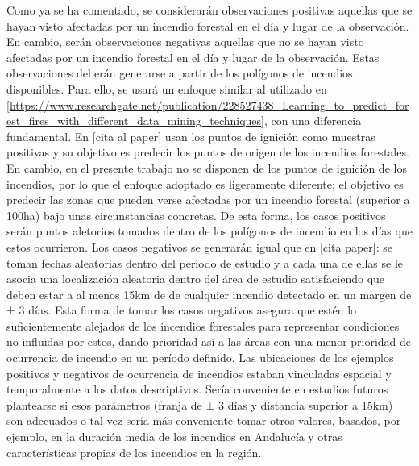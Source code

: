 \documentclass[12pt,a4paper,]{book}
\numberwithin{dummy}{section}
\theoremstyle{ocrenumbox}
\theoremstyle{blacknumex}
\theoremstyle{blacknumbox}
\theoremstyle{ocrenum}
\theoremstyle{ocrenum}
\begin{document}
Como ya se ha comentado, se considerarán observaciones positivas
aquellas que se hayan visto afectadas por un incendio forestal en el día
y lugar de la observación. En cambio, serán observaciones negativas
aquellas que no se hayan visto afectadas por un incendio forestal en el
día y lugar de la observación. Estas observaciones deberán generarse a
partir de los polígonos de incendios disponibles. Para ello, se usará un
enfoque similar al utilizado en
{[}\url{https://www.researchgate.net/publication/228527438_Learning_to_predict_forest_fires_with_different_data_mining_techniques}{]},
con una diferencia fundamental. En {[}cita al paper{]} usan los puntos
de ignición como muestras positivas y su objetivo es predecir los puntos
de origen de los incendios forestales. En cambio, en el presente trabajo
no se disponen de los puntos de ignición de los incendios, por lo que el
enfoque adoptado es ligeramente diferente; el objetivo es predecir las
zonas que pueden verse afectadas por un incendio forestal (superior a
100ha) bajo unas circunstancias concretas. De esta forma, los casos
positivos serán puntos aletorios tomados dentro de los polígonos de
incendio en los días que estos ocurrieron. Los casos negativos se
generarán igual que en {[}cita paper{]}: se toman fechas aleatorias
dentro del periodo de estudio y a cada una de ellas se le asocia una
localización aleatoria dentro del área de estudio satisfaciendo que
deben estar a al menos 15km de de cualquier incendio detectado en un
margen de ± 3 días. Esta forma de tomar los casos negativos asegura que
estén lo suficientemente alejados de los incendios forestales para
representar condiciones no influidas por estos, dando prioridad así a
las áreas con una menor prioridad de ocurrencia de incendio en un
período definido. Las ubicaciones de los ejemplos positivos y negativos
de ocurrencia de incendios estaban vinculadas espacial y temporalmente a
los datos descriptivos. Sería conveniente en estudios futuros plantearse
si esos parámetros (franja de ± 3 días y distancia superior a 15km) son
adecuados o tal vez sería más conveniente tomar otros valores, basados,
por ejemplo, en la duración media de los incendios en Andalucía y otras
características propias de los incendios en la región.
\end{document}
